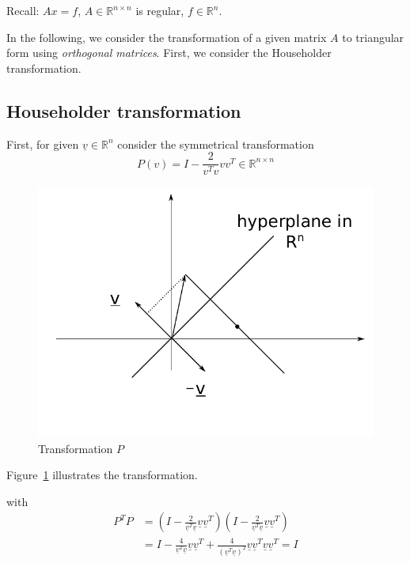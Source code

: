 \documentclass{article}
\begin{document}
Recall: $Ax = f$, $A \in \mathbb R^{n\times n}$ is regular, $f \in \mathbb R^n$.

In the following, we consider the transformation of a given matrix $A$ to triangular form using \emph{orthogonal matrices}.
First, we consider the Householder transformation.

\subsection{Householder transformation}

First, for given $\underline{v} \in \mathbb R^n$ consider the symmetrical transformation
\[ P(v) = I - \frac{2}{v^T v} v v^T \in \mathbb R^{n\times n} \]

\begin{figure}[!h]
  \begin{center}
    \includegraphics{img/06_transformation_P.pdf}
    \caption{Transformation $P$}
    \label{fig:transP}
  \end{center}
\end{figure}

Figure~\ref{fig:transP} illustrates the transformation.

with
\begin{align*}
  P^T P &= \left(I - \frac{2}{\underline{v}^T \underline{v}} \underline{v} \underline{v}^T\right) \left(I - \frac{2}{\underline{v}^T \underline{v}} \underline{v} \underline{v}^T\right) \\
    &= I - \frac{4}{\underline{v}^T \underline{v}} \underline{v} \underline{v}^T + \frac{4}{(\underline{v}^T \underline{v})^2} \underline{v} \underline{v}^T \underline{v} \underline{v}^T = I
\end{align*}
\end{document}
